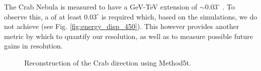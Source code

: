 \documentclass[main.tex]{subfiles}
\begin{document}
The Crab Nebula is measured to have a GeV-TeV extension of $\sim 0.03^\circ$ \cite{Fermi_LAT_Crab_extension}\cite{HESS_Crab_extension}. To observe this, a \rse of at least $0.03^\circ$ is required which, based on the simulations, we do not achieve (see Fig. \ref{fig:energy_disp_450}). This however provides another metric by which to quantify our resolution, as well as to measure possible future gains in resolution.

\begin{figure}[H]
  \begin{center}
  \end{center}
  \caption[Crab skymaps using the new \disp tables.]{Reconstruction of the Crab direction using Method5t.}
\end{figure}
\end{document}
